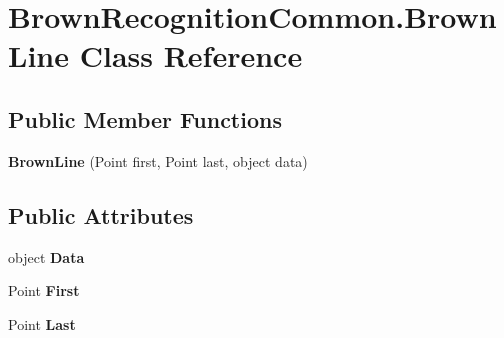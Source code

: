 \hypertarget{class_brown_recognition_common_1_1_brown_line}{
\section{\-Brown\-Recognition\-Common.\-Brown\-Line \-Class \-Reference}
\label{class_brown_recognition_common_1_1_brown_line}
}
\subsection*{\-Public \-Member \-Functions}
\begin{DoxyCompactItemize}
\item 
\hypertarget{class_brown_recognition_common_1_1_brown_line_ae4da1fbb65d461e72f4999a6c2947171}{
{\bfseries \-Brown\-Line} (\-Point first, \-Point last, object data)}
\label{class_brown_recognition_common_1_1_brown_line_ae4da1fbb65d461e72f4999a6c2947171}

\end{DoxyCompactItemize}
\subsection*{\-Public \-Attributes}
\begin{DoxyCompactItemize}
\item 
\hypertarget{class_brown_recognition_common_1_1_brown_line_a3df6fc82561f497c1bda13393dad84c3}{
object {\bfseries \-Data}}
\label{class_brown_recognition_common_1_1_brown_line_a3df6fc82561f497c1bda13393dad84c3}

\item 
\hypertarget{class_brown_recognition_common_1_1_brown_line_ad44e54d7cd1c7d42268dc84b552dec7a}{
\-Point {\bfseries \-First}}
\label{class_brown_recognition_common_1_1_brown_line_ad44e54d7cd1c7d42268dc84b552dec7a}

\item 
\hypertarget{class_brown_recognition_common_1_1_brown_line_a9bd9c1f7fd76969a75451433f9062f4f}{
\-Point {\bfseries \-Last}}
\label{class_brown_recognition_common_1_1_brown_line_a9bd9c1f7fd76969a75451433f9062f4f}

\end{DoxyCompactItemize}

